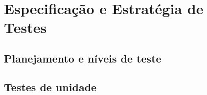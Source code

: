 \documentclass[a4paper,12pt,oneside,openany]{book}
\newif\iforientacoes
\newcommand{\orientacao}[1]{%
    \iforientacoes
        \begin{quote}
        \small\itshape\textbf{Orientação:} #1
        \end{quote}
    \fi
}
\begin{document}
%
%
%

\chapter{Especificação e Estratégia de Testes}

\orientacao{Mostrem como a equipe pretende verificar o comportamento do
software e reduzir o risco de defeitos. O capítulo deve apresentar uma
estratégia coerente, e não apenas uma lista de ferramentas.}

\section{Planejamento e níveis de teste}

\orientacao{Indiquem os níveis de teste aplicáveis ao projeto, por exemplo,
unidade, integração e sistema, e expliquem o objetivo de cada um deles no
contexto do software.}

\section{Testes de unidade}

\orientacao{Selecionem unidades relevantes e definam cenários e casos de
teste. Quando existirem dependências externas ou difíceis de controlar,
expliquem se serão utilizados \textit{stubs}, \textit{mocks} ou outras formas
de substituição. Apresentem exemplos representativos contendo entradas,
condições e resultados esperados.}
\end{document}
